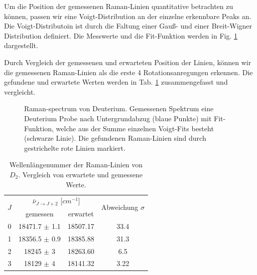 \documentclass[11 pt]{article}
\begin{document}
Um die Position der gemessenen Raman-Linien quantitative betrachten zu können, passen wir eine Voigt-Distribution an der einzelne erkennbare Peaks an. Die Voigt-Distributoin ist durch die Faltung einer Gauß- und einer Breit-Wigner Distribution definiert. Die Messwerte und die Fit-Funktion werden in Fig. \ref{fig:Deuterium} dargestellt.

Durch Vergleich der gemessenen und erwarteten Position der Linien, können wir die gemessenen Raman-Linien als die erste 4 Rotationsanregungen erkennen. Die gefundene und erwartete Werten werden in Tab. \ref{tab:D2} zusammengefasst und vergleicht. 

\begin{figure}[htbp]
	\centering
   \caption{\small Raman-spectrum von Deuterium. Gemessenen Spektrum eine Deuterium Probe nach Untergrundabzug (blaue Punkte) mit Fit-Funktion, welche aus der Summe einzelnen Voigt-Fits besteht (schwarze Linie). Die gefundenen Raman-Linien sind durch gestrichelte rote Linien markiert.}
   \label{fig:Deuterium}
\end{figure}

\begin{table}[!htbp]
 \begin{center}
  \caption{\small Wellenlängenummer der Raman-Linien von $D_2$. Vergleich von erwartete und gemessene Werte.}
   \renewcommand{\arraystretch}{1.3} %
  \label{tab:D2}
  \begin{tabular}{|c|c|c|c|}
  \hline
\multirow{2}{*}{$J$}& \multicolumn{2}{c|}{$\bar{\nu}_{J\to J+2}$ [$\unit{cm^{-1}}$]} &  \multirow{2}{*}{ Abweichung $\sigma$} \\ \cline{2-3} %
 					 & gemessen & erwartet &    			\\ 
  \hline
	\hline 
0 & 18471.7	$\pm$ 1.1	& 18507.17	& 33.4 \\
1 & 18356.5	$\pm$ 0.9	& 18385.88	& 31.3 \\
2 & 18245	$\pm$ 3	& 18263.60	& 6.5	 \\
3 & 18129	$\pm$ 4		& 18141.32	& 3.22 \\
	\hline
  \end{tabular}
  \renewcommand{\arraystretch}{1} 

 \end{center}
\end{table}
\end{document}
